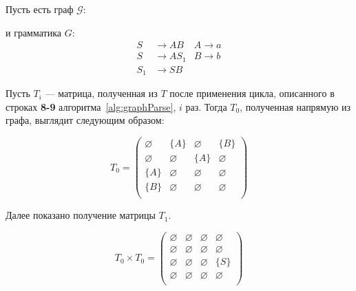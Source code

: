 \begin{example}

Пусть есть граф $\mathcal{G}$:
\begin{center}
    
\end{center}

и грамматика $G$:
\begin{align*}
S   &\to A B    &A  \to a \\ 
S  &\to A S_1   &B  \to b\\ 
S_1 &\to S B 
\end{align*}


Пусть $T_i$ --- матрица, полученная из $T$ после применения цикла, описанного в строках \textbf{8-9} алгоритма~\ref{alg:graphParse}, $i$ раз.
Тогда $T_0$, полученная напрямую из графа, выглядит следующим образом:

\[
T_0 = \begin{pmatrix}
    \varnothing & \{A\}       & \varnothing & \{B\}       \\
    \varnothing & \varnothing & \{A\}       & \varnothing \\
    \{A\}       & \varnothing & \varnothing & \varnothing \\
    \{B\}       & \varnothing & \varnothing & \varnothing \\
\end{pmatrix}
\]

Далее показано получение матрицы $T_1$.

\[
T_0 \times T_0 = \begin{pmatrix}
    \varnothing & \varnothing & \varnothing & \varnothing \\
    \varnothing & \varnothing & \varnothing & \varnothing \\
    \varnothing & \varnothing & \varnothing & \{S\}       \\
    \varnothing & \varnothing & \varnothing & \varnothing \\
\end{pmatrix}
\]


\end{example}
